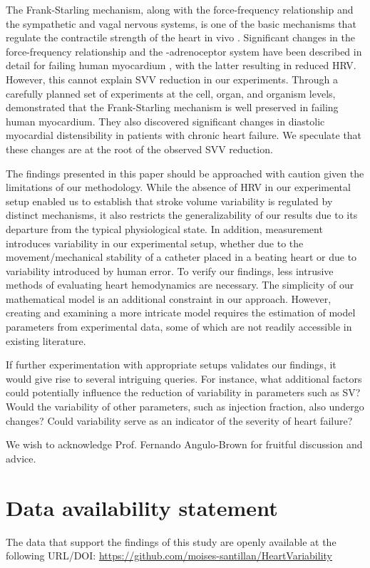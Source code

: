 \documentclass[%
preprint,
 amsmath,amssymb,
 aps,
]{revtex4-2}
\begin{document}
The Frank-Starling mechanism, along with the force-frequency relationship and the sympathetic and vagal nervous systems, is one of the basic mechanisms that regulate the contractile strength of the heart in vivo \citep{Holubarsch_1996}. Significant changes in the force-frequency relationship and the \textbeta-adrenoceptor system have been described in detail for failing human myocardium \citep{Mulieri_1992, Pieske_1992, Bristow_1982, Bristow_1989},  with the latter resulting in reduced HRV. However, this cannot explain SVV reduction in our experiments. Through a carefully planned set of experiments at the cell, organ, and organism levels, \citet{Holubarsch_1996} demonstrated that the Frank-Starling mechanism is well preserved in failing human myocardium. They also discovered significant changes in diastolic myocardial distensibility in patients with chronic heart failure. We speculate that these changes are at the root of the observed SVV reduction.

The findings presented in this paper should be approached with caution given the limitations of our methodology. While the absence of HRV in our experimental setup enabled us to establish that stroke volume variability is regulated by distinct mechanisms, it also restricts the generalizability of our results due to its departure from the typical physiological state. In addition, measurement introduces variability in our experimental setup, whether due to the movement/mechanical stability of a catheter placed in a beating heart or due to variability introduced by human error. To verify our findings, less intrusive methods of evaluating heart hemodynamics are necessary. The simplicity of our mathematical model is an additional constraint in our approach. However, creating and examining a more intricate model requires the estimation of model parameters from experimental data, some of which are not readily accessible in existing literature.

If further experimentation with appropriate setups validates our findings, it would give rise to several intriguing queries. For instance, what additional factors could potentially influence the reduction of variability in parameters such as SV? Would the variability of other parameters, such as injection fraction, also undergo changes? Could variability serve as an indicator of the severity of heart failure?

\begin{acknowledgments}
We wish to acknowledge Prof. Fernando Angulo-Brown for fruitful discussion and advice.
\end{acknowledgments}

\section*{Data availability statement}

The data that support the findings of this study are openly available at the following URL/DOI: \url{https://github.com/moises-santillan/HeartVariability}



\end{document}

